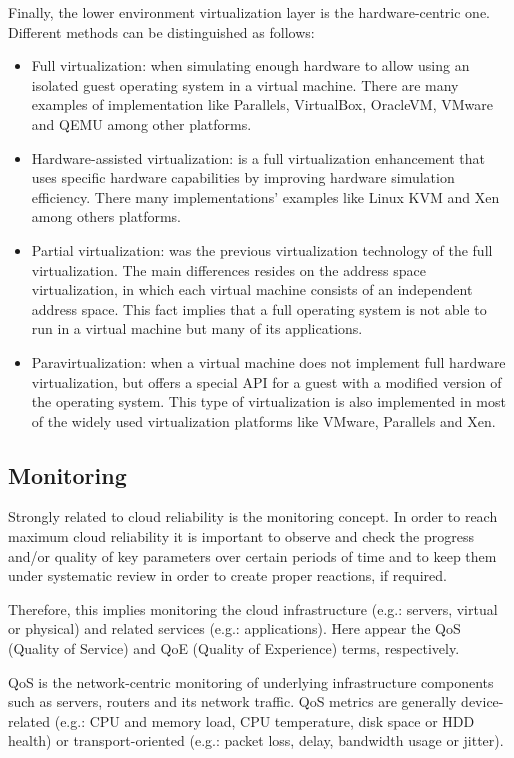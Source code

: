 Finally, the lower environment virtualization layer is the hardware-centric one. Different methods can be distinguished as follows:

\begin{itemize}
\item Full virtualization: when simulating enough hardware to allow using an isolated guest operating system in a virtual machine. There are many examples of implementation like Parallels, VirtualBox, OracleVM, VMware and QEMU among other platforms.
\item Hardware-assisted virtualization: is a full virtualization enhancement that uses specific hardware capabilities by improving hardware simulation efficiency. There many implementations' examples like Linux KVM and Xen among others platforms. 
\item Partial virtualization: was the previous virtualization technology of the full virtualization. The main differences resides on the address space virtualization, in which each virtual machine consists of an independent address space. This fact implies that a full operating system is not able to run in a virtual machine but many of its applications. 
\item Paravirtualization: when a virtual machine does not implement full hardware virtualization, but offers a special API for a guest with a modified version of the operating system. This type of virtualization is also implemented in most of the widely used virtualization platforms like VMware, Parallels and Xen.
\end{itemize}

\subsection{Monitoring}\label{SOA:monitoring}

Strongly related to cloud reliability is the monitoring concept. In order to reach maximum cloud reliability it is important to observe and check the progress and/or quality of key parameters over certain periods of time and to keep them under systematic review in order to create proper reactions, if required.

Therefore, this implies monitoring the cloud infrastructure (e.g.: servers, virtual or physical) and related services (e.g.: applications). Here appear the QoS (Quality of Service) and QoE (Quality of Experience) terms, respectively.

QoS is the network-centric monitoring of underlying infrastructure components such as servers, routers and its network traffic. QoS metrics are generally device-related (e.g.: CPU and memory load, CPU temperature, disk space or HDD health) or transport-oriented (e.g.: packet loss, delay, bandwidth usage or jitter). 

